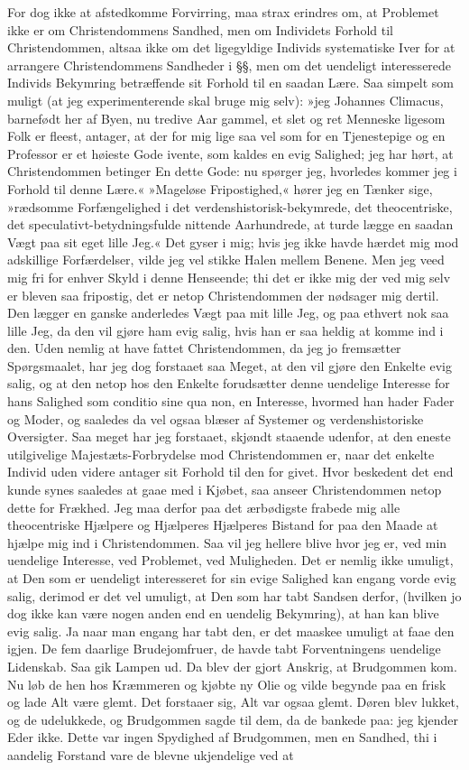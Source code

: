 \documentclass[12pt,a4paper]{article}
\begin{document}
For dog ikke at afstedkomme Forvirring, maa strax erindres om, at Problemet ikke er om Christendommens Sandhed, men om Individets Forhold til Christendommen, altsaa ikke om det ligegyldige Individs systematiske Iver for at arrangere Christendommens Sandheder i §§, men om det uendeligt interesserede Individs Bekymring betræffende sit Forhold til en saadan Lære. Saa simpelt som muligt (at jeg experimenterende skal bruge mig selv): »jeg Johannes Climacus, barnefødt her af Byen, nu tredive Aar gammel, et slet og ret Menneske ligesom Folk er fleest, antager, at der for mig lige saa vel som for en Tjenestepige og en Professor er et høieste Gode ivente, som kaldes en evig Salighed; jeg har hørt, at Christendommen betinger En dette Gode: nu spørger jeg, hvorledes kommer jeg i Forhold til denne Lære.« »Mageløse Fripostighed,« hører jeg en Tænker sige, »rædsomme Forfængelighed i det verdenshistorisk-bekymrede, det theocentriske, det speculativt-betydningsfulde nittende Aarhundrede, at turde lægge en saadan Vægt paa sit eget lille Jeg.« Det gyser i mig; hvis jeg ikke havde hærdet mig mod adskillige Forfærdelser, vilde jeg vel stikke Halen mellem Benene. Men jeg veed mig fri for enhver Skyld i denne Henseende; thi det er ikke mig der ved mig selv er bleven saa fripostig, det er netop Christendommen der nødsager mig dertil. Den lægger en ganske anderledes Vægt paa mit lille Jeg, og paa ethvert nok saa lille Jeg, da den vil gjøre ham evig salig, hvis han er saa heldig at komme ind i den. Uden nemlig at have fattet Christendommen, da jeg jo fremsætter Spørgsmaalet, har jeg dog forstaaet saa Meget, at den vil gjøre den Enkelte evig salig, og at den netop hos den Enkelte forudsætter denne uendelige Interesse for hans Salighed som conditio sine qua non, en Interesse, hvormed han hader Fader og Moder, og saaledes da vel ogsaa blæser af Systemer og verdenshistoriske Oversigter. Saa meget har jeg forstaaet, skjøndt staaende udenfor, at den eneste utilgivelige Majestæts-Forbrydelse mod Christendommen er, naar det enkelte Individ uden videre antager sit Forhold til den for givet. Hvor beskedent det end kunde synes saaledes at gaae med i Kjøbet, saa anseer Christendommen netop dette for Frækhed. Jeg maa derfor paa det ærbødigste frabede mig alle theocentriske Hjælpere og Hjælperes Hjælperes Bistand for paa den Maade at hjælpe mig ind i Christendommen. Saa vil jeg hellere blive hvor jeg er, ved min uendelige Interesse, ved Problemet, ved Muligheden. Det er nemlig ikke umuligt, at Den som er uendeligt interesseret for sin evige Salighed kan engang vorde evig salig, derimod er det vel umuligt, at Den som har tabt Sandsen derfor, (hvilken jo dog ikke kan være nogen anden end en uendelig Bekymring), at han kan blive evig salig. Ja naar man engang har tabt den, er det maaskee umuligt at faae den igjen. De fem daarlige Brudejomfruer, de havde tabt Forventningens uendelige Lidenskab. Saa gik Lampen ud. Da blev der gjort Anskrig, at Brudgommen kom. Nu løb de hen hos Kræmmeren og kjøbte ny Olie og vilde begynde paa en frisk og lade Alt være glemt. Det forstaaer sig, Alt var ogsaa glemt. Døren blev lukket, og de udelukkede, og Brudgommen sagde til dem, da de bankede paa: jeg kjender Eder ikke. Dette var ingen Spydighed af Brudgommen, men en Sandhed, thi i aandelig Forstand vare de blevne ukjendelige ved at 
\end{document}
